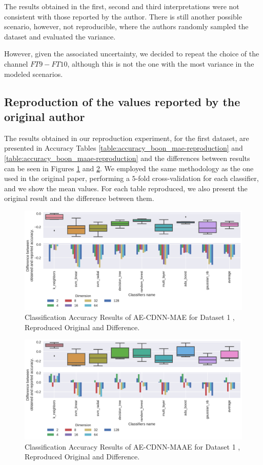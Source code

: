 The results obtained in the first, second and third interpretations were not consistent with those reported by the author. There is still another possible scenario, however, not reproducible, where the authors randomly sampled the dataset and evaluated the variance.

However, given the associated uncertainty, we decided to repeat the choice of the channel $FT9-FT10$, although this is not the one with the most variance in the modeled scenarios.


\subsection{Reproduction of the values reported by the original author}

The results obtained in our reproduction experiment, for the first dataset, are presented in Accuracy Tables \ref{table:accuracy_boon_mae-reproduction} and \ref{table:accuracy_boon_maae-reproduction} and the differences between results can be seen in Figures \ref{fig:acc-AE-CDNN-MAE-d1} and \ref{fig:acc-AE-CDNN-MAAE-d1}. We employed the same methodology as the one used in the original paper, performing a $5$-fold cross-validation for each classifier, and we show the mean values. For each table reproduced, we also present the original result and the difference between them.







\begin{figure}[!ht]
  \centering
  \includegraphics[width=0.8\linewidth]{figure/table_2.pdf}
  \caption{Classification Accuracy Results of AE-CDNN-MAE for Dataset 1 \cite{WenZha:2018}, Reproduced Original and Difference.}
\label{fig:acc-AE-CDNN-MAE-d1}
\end{figure}

\begin{figure}[!ht]
  \centering
  \includegraphics[width=0.8\linewidth]{figure/table_3.pdf}
  \caption{Classification Accuracy Results of AE-CDNN-MAAE for Dataset 1 \cite{WenZha:2018}, Reproduced Original and Difference.}
\label{fig:acc-AE-CDNN-MAAE-d1}
\end{figure}

